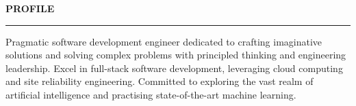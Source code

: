 \documentclass{cv}
\def\sectionskip{\medskip}
\begin{document}
\sectionskip
{} \textbf{PROFILE}
\sectionlineskip
\hrule

Pragmatic software development engineer dedicated to crafting imaginative solutions and solving complex problems with principled thinking and engineering leadership. Excel in full-stack software development, leveraging cloud computing and site reliability engineering. Committed to exploring the vast realm of artificial intelligence and practising state-of-the-art machine learning.

    
\end{document}
